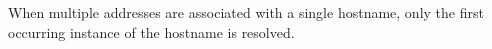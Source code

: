 When multiple addresses are associated with a single hostname, only the first occurring instance of the hostname is resolved.